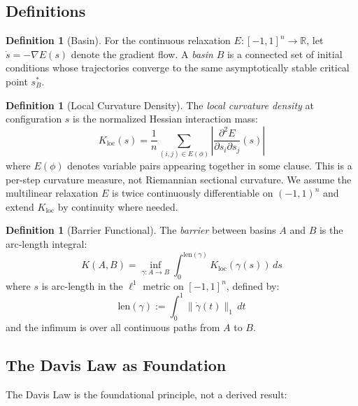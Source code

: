 \documentclass[11pt,a4paper]{article}
\theoremstyle{plain}
\theoremstyle{definition}
\newtheorem{definition}[theorem]{Definition}
\theoremstyle{remark}
\begin{document}
\subsection{Definitions}

\begin{definition}[Basin]
\label{def:basin}
For the continuous relaxation $E: [-1,1]^n \to \mathbb{R}$, let $\dot{s} = -\nabla E(s)$ denote the gradient flow. A \emph{basin} $B$ is a connected set of initial conditions whose trajectories converge to the same asymptotically stable critical point $s_B^*$.
\end{definition}

\begin{definition}[Local Curvature Density]
\label{def:curvature}
The \emph{local curvature density} at configuration $s$ is the normalized Hessian interaction mass:
\begin{equation}
    K_{\text{loc}}(s) = \frac{1}{n} \sum_{(i,j) \in E(\phi)} \left|\frac{\partial^2 E}{\partial s_i \partial s_j}(s)\right|
\end{equation}
where $E(\phi)$ denotes variable pairs appearing together in some clause. This is a per-step curvature measure, not Riemannian sectional curvature. We assume the multilinear relaxation $E$ is twice continuously differentiable on $(-1,1)^n$ and extend $K_{\text{loc}}$ by continuity where needed.
\end{definition}

\begin{definition}[Barrier Functional]
\label{def:barrier}
The \emph{barrier} between basins $A$ and $B$ is the arc-length integral:
\begin{equation}
    K(A, B) = \inf_{\gamma: A \to B} \int_0^{\text{len}(\gamma)} K_{\text{loc}}(\gamma(s)) \, ds
\end{equation}
where $s$ is arc-length in the $\ell^1$ metric on $[-1,1]^n$, defined by:
\begin{equation}
    \text{len}(\gamma) := \int_0^1 \|\dot{\gamma}(t)\|_1 \, dt
\end{equation}
and the infimum is over all continuous paths from $A$ to $B$.
\end{definition}

\subsection{The Davis Law as Foundation}

The Davis Law is the foundational principle, not a derived result:
\end{document}
